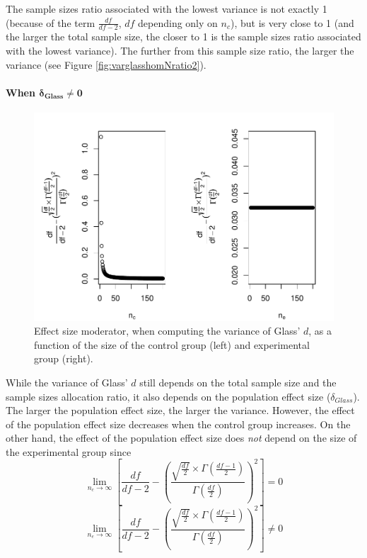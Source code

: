 \documentclass[
  english,
  man,mask]{apa6}
\let\oldparagraph\paragraph
\renewcommand{\paragraph}[1]{\oldparagraph{#1}\mbox{}}
\begin{document}
The sample sizes ratio associated with the lowest variance is not exactly 1 (because of the term \(\frac{df}{df-2}\), \(df\) depending only on \(n_c\)), but is very close to 1 (and the larger the total sample size, the closer to 1 is the sample sizes ratio associated with the lowest variance). The further from this sample size ratio, the larger the variance (see Figure \ref{fig:varglasshomNratio2}).

\hypertarget{when-bmdelta_glass-neq-0}{%
\paragraph{\texorpdfstring{When \(\bm{\delta_{Glass} \neq 0}\)}{When \textbackslash bm\{\textbackslash delta\_\{Glass\} \textbackslash neq 0\}}}\label{when-bmdelta_glass-neq-0}}

\begin{figure}
\centering
\includegraphics{Theoretical-Variance-of-all-estimators-as-a-function-of-population-parameters_files/figure-latex/ESmoderatorGlassNsize2-1.pdf}
\caption{\label{fig:ESmoderatorGlassNsize2}Effect size moderator, when computing the variance of Glass' \(d\), as a function of the size of the control group (left) and experimental group (right).}
\end{figure}

While the variance of Glass' \(d\) still depends on the total sample size and the sample sizes allocation ratio, it also depends on the population effect size (\(\delta_{Glass}\)). The larger the population effect size, the larger the variance. However, the effect of the population effect size decreases when the control group increases. On the other hand, the effect of the population effect size does \emph{not} depend on the size of the experimental group since\\
\[\lim_{n_c\rightarrow \infty}\left[\frac{df}{df-2} - \left( \frac{\sqrt{\frac{df}{2}} \times \Gamma \left(\frac{df-1}{2} \right)}{\Gamma \left( \frac{df}{2}\right)}\right)^2 \right]=0\]
\[\lim_{n_e\rightarrow \infty}\left[\frac{df}{df-2} - \left( \frac{\sqrt{\frac{df}{2}} \times \Gamma \left(\frac{df-1}{2} \right)}{\Gamma \left( \frac{df}{2}\right)}\right)^2 \right] \neq 0\]
\end{document}
